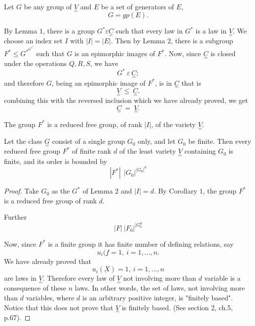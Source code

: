 Let $G$ be any group of $\underset{=}{V}$ and $E$ be a set of
generators of $E$, 
$$
G = gp(E).
$$

By Lemma $1$, there is a group $G^* \varepsilon \underset{=}{C} $ such
that every law in $G^*$ is  a law in $\underset{=}{V}$. We choose  an
index set $I$ with $|I| = |E|$. Then by Lemma $2$, there is a subgroup
$F^* \leq G^{*^{G^{*^{I}}}}$ such that $G$ is an epimorphic images of
$F^*$. Now, since $\underset{=}{C}$ is closed under the operations
$Q,R,S$, we have 
$$
G^* ~\varepsilon ~\underset{=}{C};
$$
and therefore $G$, being an epimorphic image of $F^*$, is in
$\underset{=}{C}$ that is 
$$
\underset{=}{V}~ \leq ~\underset{=}{C}.
$$
combining this with the reversed inclusion which we have already proved, we get
$$
\underset{=}{C}~ =~ \underset{=}{V}.
$$

\setcounter{corollary}{0}
\begin{corollary}%
  The group $F^*$ is a reduced free group, of rank $|I|$, of the
  variety $\underset{=}{V}$. 
\end{corollary}

\begin{corollary}%
  Let the class $\underset{=}{G}$ consist of a single group $G_0$
  only, and let $G_0$ be finite. Then every reduced free group $F^*$
  of  finite rank  $d$ of the  least variety $\underset{=}{V}$
  containing  $G_0$ is finite,  and its order is bounded by 
  $$
  |F^*| ~ ~|G_0|^{|G_0|^{d}}
  $$
\end{corollary}

\begin{proof}
  Take $G_0$ as the $G^*$ of Lemma $2$ and $|I| = d $. By Corollary
  $1$, the group $F^*$ is a reduced free group of rank $d$.  

  Further
  $$
  |F| ~  |F_0|^{|G_0^{d}}
  $$
  
  Now, since $F^*$  is a finite group it has finite number of defining
  relations, say 
  $$
  u_i(\underbar{f} = 1, ~ i=1, \ldots,n.
  $$
  We have already proved that 
  $$
  u_i(\underbar{X}) = 1, ~ i=1, \ldots,n
  $$
  are laws in $\underset{=}{V}$. Therefore every law of
  $\underset{=}{V}$ not involving more than $d$ variable is a
  consequence of these $n$ laws. In other words, the set of laws, not
  involving more than $d$ variables, where $d$ is an arbitrary
  positive integer, is "finitely based". Notice that  this does not
  prove that $\underset{=}{V}$ is finitely based. (See section 2,
  ch.5, p.67).  
\end{proof}

